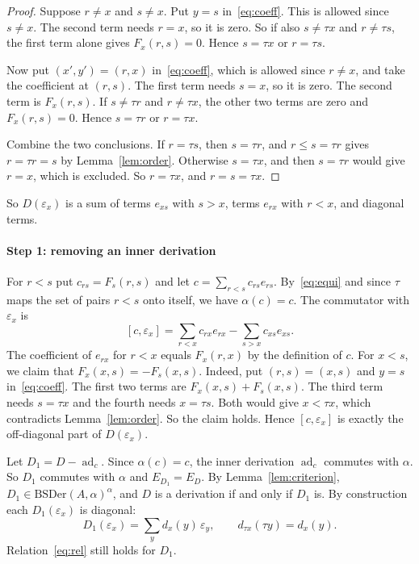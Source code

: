 \documentclass[]{interact}
\theoremstyle{plain}
\theoremstyle{definition}
\theoremstyle{remark}
\newcommand{\BSDer}{\mathrm{BSDer}}
\begin{document}
\begin{proof}
Suppose $r \ne x$ and $s \ne x$.
Put $y = s$ in~\eqref{eq:coeff}.
This is allowed since $s \ne x$.
The second term needs $r = x$, so it is zero.
So if also $s \ne \tau x$ and $r \ne \tau s$, the first term alone gives $F_x(r,s) = 0$.
Hence $s = \tau x$ or $r = \tau s$.

Now put $(x', y') = (r, x)$ in~\eqref{eq:coeff}, which is allowed since $r \ne x$, and take the coefficient at $(r,s)$.
The first term needs $s = x$, so it is zero.
The second term is $F_x(r,s)$.
If $s \ne \tau r$ and $r \ne \tau x$, the other two terms are zero and $F_x(r,s) = 0$.
Hence $s = \tau r$ or $r = \tau x$.

Combine the two conclusions.
If $r = \tau s$, then $s = \tau r$, and $r \le s = \tau r$ gives $r = \tau r = s$ by Lemma~\ref{lem:order}.
Otherwise $s = \tau x$, and then $s = \tau r$ would give $r = x$, which is excluded.
So $r = \tau x$, and $r = s = \tau x$.
\end{proof}

So $D(\varepsilon_x)$ is a sum of terms $e_{xs}$ with $s > x$, terms $e_{rx}$ with $r < x$, and diagonal terms.

\paragraph*{Step 1: removing an inner derivation}

For $r < s$ put $c_{rs} = F_s(r,s)$ and let $c = \sum_{r<s} c_{rs}e_{rs}$.
By~\eqref{eq:equi} and since $\tau$ maps the set of pairs $r < s$ onto itself, we have $\alpha(c) = c$.
The commutator with $\varepsilon_x$ is
\[
[c, \varepsilon_x] = \sum_{r < x} c_{rx}e_{rx} - \sum_{s > x} c_{xs}e_{xs}.
\]
The coefficient of $e_{rx}$ for $r < x$ equals $F_x(r,x)$ by the definition of $c$. %
For $x < s$, we claim that $F_x(x,s) = -F_s(x,s)$.
Indeed, put $(r,s) = (x,s)$ and $y = s$ in~\eqref{eq:coeff}.
The first two terms are $F_x(x,s) + F_s(x,s)$. %
The third term needs $s = \tau x$ and the fourth needs $x = \tau s$.
Both would give $x < \tau x$, which contradicts Lemma~\ref{lem:order}.
So the claim holds.
Hence $[c,\varepsilon_x]$ is exactly the off-diagonal part of $D(\varepsilon_x)$.

Let $D_1 = D - \operatorname{ad}_c$.
Since $\alpha(c) = c$, the inner derivation $\operatorname{ad}_c$ commutes with $\alpha$.
So $D_1$ commutes with $\alpha$ and $E_{D_1} = E_D$.
By Lemma~\ref{lem:criterion}, $D_1 \in \BSDer(A,\alpha)^\alpha$, and $D$ is a derivation if and only if $D_1$ is.
By construction each $D_1(\varepsilon_x)$ is diagonal:
\[
D_1(\varepsilon_x) = \sum_y d_x(y)\,\varepsilon_y, \qquad d_{\tau x}(\tau y) = d_x(y).
\]
Relation~\eqref{eq:rel} still holds for $D_1$.
\end{document}
